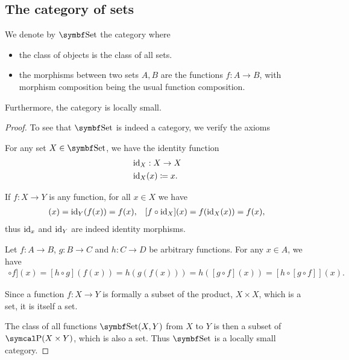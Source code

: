 \subsection{The category of sets}\label{subsec:category_of_sets}

\begin{definition}\label{def:category_of_sets}
  We denote by \( \Cat{Set} \) the category where
  \begin{itemize}
    \item the class of objects is the class of all sets.
    \item the morphisms between two sets \( A, B \) are the functions \( f: A \to B \), with morphism composition being the usual function composition.
  \end{itemize}

  Furthermore, the category is locally small.
\end{definition}
\begin{proof}
  To see that \( \Cat{Set} \) is indeed a category, we verify the axioms
  \begin{description}
     For any set \( X \in \Cat{Set} \), we have the identity function
    \begin{align*}
      &\operatorname{id}_X: X \to X \\
      &\operatorname{id}_X(x) \coloneqq x.
    \end{align*}

    If \( f: X \to Y \) is any function, for all \( x \in X \) we have
    \begin{align*}
      [\Id_Y \circ f](x) = \Id_Y(f(x)) = f(x),
      &&
      [f \circ \Id_X](x) = f(\Id_X(x)) = f(x),
    \end{align*}
    thus \( \operatorname{id}_x \) and \( \operatorname{id}_Y \) are indeed identity morphisms.

     Let \( f: A \to B \), \( g: B \to C \) and \( h: C \to D \) be arbitrary functions. For any \( x \in A \), we have
    \begin{align*}
      [[h \circ g] \circ f](x)
      =
      [h \circ g](f(x))
      =
      h(g(f(x)))
      =
      h([g \circ f](x))
      =
      [h \circ [g \circ f]](x).
    \end{align*}
  \end{description}

  Since a function \( f: X \to Y \) is formally a subset of the product, \( X \times X \), which is a set, it is itself a set.

  The class of all functions \( \Cat{Set}(X, Y) \) from \( X \) to \( Y \) is then a subset of \( \Power(X \times Y) \), which is also a set. Thus \( \Cat{Set} \) is a locally small category.
\end{proof}

